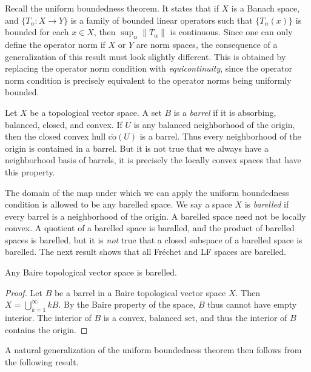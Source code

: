 Recall the uniform boundedness theorem. It states that if $X$ is a Banach space, and $\{ T_\alpha: X \to Y \}$ is a family of bounded linear operators such that $\{ T_\alpha(x) \}$ is bounded for each $x \in X$, then $\sup_\alpha \| T_\alpha \|$ is continuous. Since one can only define the operator norm if $X$ or $Y$ are norm spaces, the consequence of a generalization of this result must look slightly different. This is obtained by replacing the operator norm condition with \emph{equicontinuity}, since the operator norm condition is precisely equivalent to the operator norms being uniformly bounded.

Let $X$ be a topological vector space. A set $B$ is a \emph{barrel} if it is absorbing, balanced, closed, and convex. If $U$ is any balanced neighborhood of the origin, then the closed convex hull $\overline{\text{co}}(U)$ is a barrel. Thus every neighborhood of the origin is contained in a barrel. But it is not true that we always have a neighborhood basis of barrels, it is precisely the locally convex spaces that have this property.

The domain of the map under which we can apply the uniform boundedness condition is allowed to be any barelled space. We say a space $X$ is \emph{barelled} if every barrel is a neighborhood of the origin. A barelled space need not be locally convex. A quotient of a barelled space is baralled, and the product of barelled spaces is barelled, but it is \emph{not} true that a closed subspace of a barelled space is barelled. The next result shows that all Fr\'{e}chet and LF spaces are barelled.

\begin{theorem}
    Any Baire topological vector space is barelled.
\end{theorem}
\begin{proof}
    Let $B$ be a barrel in a Baire topological vector space $X$. Then $X = \bigcup_{k = 1}^\infty kB$. By the Baire property of the space, $B$ thus cannot have empty interior. The interior of $B$ is a convex, balanced set, and thus the interior of $B$ contains the origin.
\end{proof}

A natural generalization of the uniform boundedness theorem then follows from the following result.

